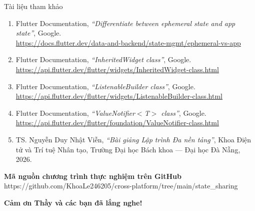 \documentclass[aspectratio=169, 11pt]{beamer}
\newcommand{\currentsectionname}{}
\newcommand{\setsectionfooter}[1]{\renewcommand{\currentsectionname}{#1}}
\begin{document}
\setsectionfooter{Tài liệu tham khảo}
\begin{frame}{Tài liệu tham khảo}
  \vspace{0.02cm}
  \begin{enumerate}\setlength{\itemsep}{0.08cm}
    \footnotesize
    \item Flutter Documentation, \textit{``Differentiate between ephemeral state and app state''}, Google.\\
          {\color{DarkMain}\url{https://docs.flutter.dev/data-and-backend/state-mgmt/ephemeral-vs-app}}
    \item Flutter Documentation, \textit{``InheritedWidget class''}, Google.\\
          {\color{DarkMain}\url{https://api.flutter.dev/flutter/widgets/InheritedWidget-class.html}}
    \item Flutter Documentation, \textit{``ListenableBuilder class''}, Google.\\
          {\color{DarkMain}\url{https://api.flutter.dev/flutter/widgets/ListenableBuilder-class.html}}
    \item Flutter Documentation, \textit{``ValueNotifier$<$T$>$ class''}, Google.\\
          {\color{DarkMain}\url{https://api.flutter.dev/flutter/foundation/ValueNotifier-class.html}}
    \item TS. Nguyễn Duy Nhật Viễn, \textit{``Bài giảng Lập trình Đa nền tảng''}, Khoa Điện tử và Trí tuệ Nhân tạo, Trường Đại học Bách khoa --- Đại học Đà Nẵng, 2026.
  \end{enumerate}

  \vspace{0.18cm}
  \begin{codepanel}
    {\bfseries\color{DarkMain} Mã nguồn chương trình thực nghiệm trên GitHub}\\[2pt]
    {\footnotesize\ttfamily\color{DarkMain} https://github.com/KhoaLe246205/cross-platform/tree/main/state\_sharing}
  \end{codepanel}
\end{frame}

\setsectionfooter{}
\begin{frame}
  \vspace{1.95cm}
  \centering
  {\fontsize{19.5pt}{25pt}\selectfont\bfseries\color{DarkMain}
    Cảm ơn Thầy và các bạn đã lắng nghe!\par
  }
\end{frame}
\end{document}
